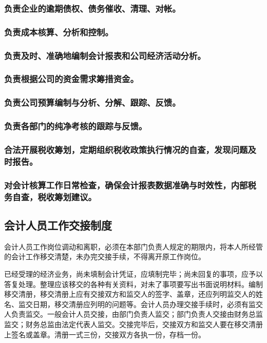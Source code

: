 \documentclass{ctexart}
\begin{document}
\subsubsection{负责企业的逾期债权、债务催收、清理、对帐。}
\label{sec-1-7-3}
\subsubsection{负责成本核算、分析和控制。}
\label{sec-1-7-4}
\subsubsection{负责及时、准确地编制会计报表和公司经济活动分析。}
\label{sec-1-7-5}
\subsubsection{负责根据公司的资金需求筹措资金。}
\label{sec-1-7-6}
\subsubsection{负责公司预算编制与分析、分解、跟踪、反馈。}
\label{sec-1-7-7}
\subsubsection{负责各部门的纯净考核的跟踪与反馈。}
\label{sec-1-7-8}
\subsubsection{合法开展税收筹划，定期组织税收政策执行情况的自查，发现问题及时报告。}
\label{sec-1-7-9}
\subsubsection{对会计核算工作日常检查，确保会计报表数据准确与时效性，内部税务自查，税收筹划建议。}
\label{sec-1-7-10}
\subsection{会计人员工作交接制度}
\label{sec-1-8}
会计人员工作岗位调动和离职，必须在本部门负责人规定的期限内，将本人所经管的会计工作移交清楚，未办完交接手续，不得离开原工作岗位。

已经受理的经济业务，尚未填制会计凭证，应填制完毕；尚未回复的事项，应予以答复处理。整理应该移交的各种有关资料，对未了事项要写出书面说明材料。编制移交清册，移交清册上应有交接双方和监交人的签字、盖章，还应列明监交人的姓名、监交日期，移交清册应列明的问题等。会计人员办理交接手续时，必须有监交人负责监交。一般会计人员交接，由部门负责人监交；部门负责人交接由财务总监监交；财务总监由法定代表人监交。交接完毕后，交接双方和监交人要在移交清册上签名或盖章。清册一式三份，交接双方各执一份，存档一份。
\end{document}
